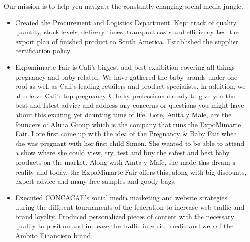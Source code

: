\documentclass[paper=a4,fontsize=10pt,ragged2e,withhyper]{altacv}%
\begin{document}
\begin{paracol}{2}
\begin{itemize}
Our mission is to help you navigate the constantly changing social media jungle. 
\end{itemize}
\divider
{}
\begin{itemize}
 \item Created the Procurement and Logistics Department.\newline%
Kept track of quality, quantity, stock levels, delivery times, transport costs and efficiency\newline%
Led the export plan of finished product to South America.\newline%
Established the supplier certification policy. 
\end{itemize}
\divider
{}
\begin{itemize}
 \item Expomimarte Fair is Cali’s biggest and best exhibition covering all things pregnancy and baby related.\newline%
We have gathered the baby brands under one roof as well as Cali’s leading retailers and product specialists. In addition, we also have Cali’s top pregnancy \& baby professionals ready to give you the best and latest advice and address any concerns or questions you might have about this exciting yet daunting time of life.\newline%
Lore, Anita y Mafe, are the founders of Aluna Group which is the company that runs the ExpoMimarte Fair. Lore first came up with the idea of the Pregnancy \& Baby Fair when she was pregnant with her first child Simon. She wanted to be able to attend a show where she could view, try, test and buy the safest and best baby products on the market. Along with Anita y Mafe, she made this dream a reality and today, the ExpoMimarte Fair offers this, along with big discounts, expert advice and many free samples and goody bags. 
\end{itemize}
\divider
{}
\begin{itemize}
 \item Executed CONCACAF's social media marketing and website strategies during the different tournaments of the federation to increase web traffic and brand loyalty.\newline%
Produced personalized pieces of content with the necessary quality to position and increase the traffic in social media and web of the Ambito Financiero brand.\newline%

\end{itemize}
\end{paracol}
\end{document}

